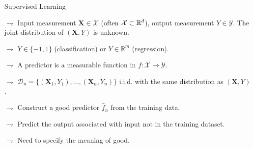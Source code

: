 \documentclass[xcolor={usenames,dvipsnames},handout]{beamer}
\begin{document}
\begin{frame}{Supervised  Learning}

$\rightharpoondown$ \alert{Input} measurement $\textbf{X}  \in \mathcal{X}$ (often $\mathcal{X} \subset \mathbb{R}^d$), \alert{output} measurement $Y \in \mathcal{Y}$. The joint distribution of $(\textbf{X},Y)$ is  \alert{unknown}.

\vspace{.1cm}

$\rightharpoondown$  $Y \in \{-1,1\}$ (classification) or $Y \in \mathbb{R}^m$ (regression).

\vspace{.1cm}

$\rightharpoondown$ A \alert{predictor} is a measurable function in $ f:\mathcal{X} \to \mathcal{Y}$.

\vspace{.5cm}


$\rightharpoondown$ $\mathcal{D}_n=\{(\textbf{X}_1, Y_1),\ldots,(\textbf{X}_n, Y_n)\}$ i.i.d. with the same distribution as $(\textbf{X},Y)$.




\vspace{.5cm}


$\rightharpoondown$  Construct a \alert{good} predictor $\widehat{f}_n$ from the training data.

\vspace{.1cm}

$\rightharpoondown$ Predict the output associated with \alert{input not in the training dataset}.

\vspace{.1cm}

$\rightharpoondown$  Need to specify the meaning of good.

\end{frame}
\end{document}
